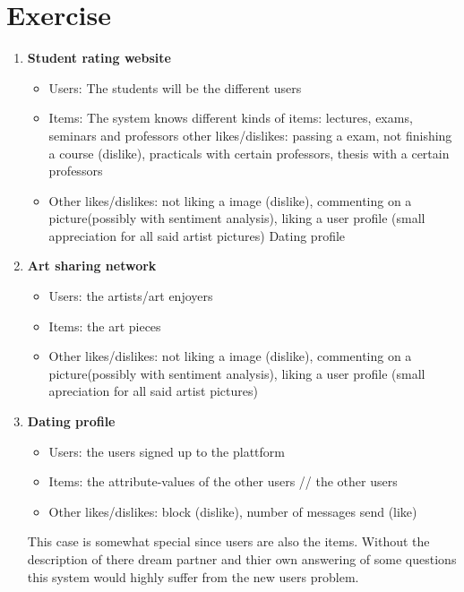 \section{Exercise}

\begin{enumerate}[label=(\alph*)]
    \item \textbf{Student rating website}
    \begin{itemize}
        \item Users: The students will be the different users 
        \item Items: The system knows different kinds of items: lectures, exams, seminars and professors
        other likes/dislikes: passing a exam, not finishing a course (dislike), practicals with certain professors,
        thesis with a certain professors
        \item Other likes/dislikes: not liking a image (dislike), commenting on a picture(possibly with sentiment
        analysis), liking a user profile (small appreciation for all said artist pictures)
        Dating profile
    \end{itemize}
    \item \textbf{Art sharing network}
    \begin{itemize}
        \item Users: the artists/art enjoyers
        \item Items: the art pieces
        \item Other likes/dislikes: not liking a image (dislike), commenting on a picture(possibly with sentiment
        analysis), liking a user profile (small apreciation for all said artist pictures)
    \end{itemize}
    \item \textbf{Dating profile}
    \begin{itemize}
        \item Users: the users signed up to the plattform
        \item Items: the attribute-values of the other users // the other users
        \item Other likes/dislikes: block (dislike), number of messages send (like)
    \end{itemize}
    This case is somewhat special since users are also the items. Without the description of there dream
partner and thier own answering of some questions this system would highly suffer from the new users
problem.
\end{enumerate}




